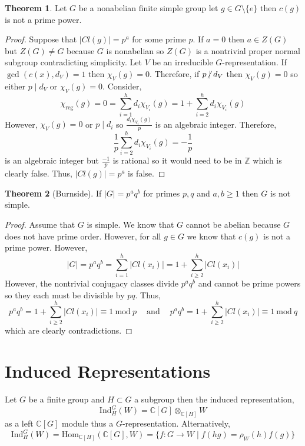 \documentclass[12pt]{extarticle}
\newcommand{\divides}{\mid}
\newcommand{\ndivides}{\centernot \mid}
\newcommand{\Z}{\mathbb{Z}}
\newcommand{\C}{\mathbb{C}}
\renewcommand{\mod}[3]{\: #1 \equiv #2 \: \mathrm{mod} \: #3 \:}
\newcommand{\sm}{\! \setminus \!}
\newcommand{\Ind}[3]{\mathrm{Ind}_{#2}^{#1}\left(#3\right)}
\newcommand{\Homover}[3]{\mathrm{Hom}_{#1}\left(#2, #3\right)}
\theoremstyle{definition}
\newtheorem{theorem}{Theorem}[section]
\newenvironment{definition}[1][Definition:]{\begin{trivlist}
\item[\hskip \labelsep {\bfseries #1}]}{\end{trivlist}}
\begin{document}
\begin{theorem}
Let $G$ be a nonabelian finite simple group let $g \in G \sm \{e\}$ then $c(g)$ is not a prime power.
\end{theorem}

\begin{proof}
Suppose that $|Cl(g)| = p^a$ for some prime $p$. If $a = 0$ then $a \in Z(G)$ but $Z(G) \neq G$ because $G$ is nonabelian so $Z(G)$ is a nontrivial proper normal subgroup contradicting simplicity. Let $V$ be an irreducible $G$-representation. If $\gcd{(c(x), d_V)} = 1$ then $\chi_V(g) = 0$. Therefore, if $p \ndivides d_V$ then $\chi_V(g) = 0$ so either $p \divides d_V$ or $\chi_V(g) = 0$. Consider,
\[\chi_{\mathrm{reg}}(g) = 0 = \sum_{i = 1}^h d_i \chi_{V_i}(g) = 1 + \sum_{i = 2}^h d_i \chi_{V_i}(g)\]
However, $\chi_V(g) = 0$ or $p \divides d_i$ so $\frac{d_i \chi_{V_i}(g)}{p}$ is an algebraic integer. Therefore,
\[ \frac{1}{p} \sum_{i = 2}^h d_i \chi_{V_i}(g) = - \frac{1}{p} \]
is an algebraic integer but $\frac{-1}{p}$ is rational so it would need to be in $\Z$ which is clearly false. Thus, $|Cl(g)| = p^a$ is false. 
\end{proof}

\begin{theorem}[Burnside]
If $|G| = p^a q^b$ for primes $p, q$ and $a, b \ge 1$ then $G$ is not simple. 
\end{theorem}
\begin{proof}
Assume that $G$ is simple. We know that $G$ cannot be abelian because $G$ does not have prime order. However, for all $g \in G$ we know that $c(g)$ is not a prime power. However, 
\[ |G| = p^a q^b = \sum_{i = 1}^h |Cl(x_i)| = 1 + \sum_{i \ge 2}^h |Cl(x_i)| \]
However, the nontrivial conjugacy classes divide $p^a q^b$ and cannot be prime powers so they each must be divisible by $pq$. Thus,
\[ \mod{p^a q^b = 1 + \sum_{i \ge 2}^h |Cl(x_i)|}{1}{p} \quad \text{and} \quad \mod{p^a q^b = 1 + \sum_{i \ge 2}^h |Cl(x_i)|}{1}{q} \]
which are clearly contradictions.
\end{proof}

\section{Induced Representations}

\begin{definition}
Let $G$ be a finite group and $H \subset G$ a subgroup then the induced representation,
\[ \Ind{G}{H}{W} = \C[G] \otimes_{\C[H]} W \]
as a left $\C[G]$ module thus a $G$-representation. Alternatively,
\[ \Ind{G}{H}{W} = \Homover{\C[H]}{\C[G]}{W} = \{ f : G \to W \mid f(hg) = \rho_W(h) f(g) \} \] 
\end{definition}
\end{document}
